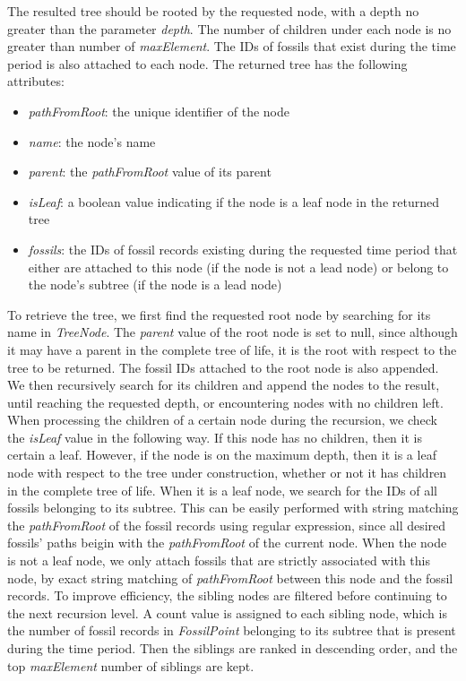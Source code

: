 \documentclass[11pt, a4paper,oneside,chapterprefix=false]{scrbook}
\begin{document}
The resulted tree should be rooted by the requested node, with a depth no greater than the parameter \emph{depth}. The number of children under each node is no greater than number of \emph{maxElement}. The IDs of fossils that exist during the time period is also attached to each node. The returned tree has the following attributes:  

\begin{itemize}
	\item \textit{pathFromRoot}: the unique identifier of the node
	\item \textit{name}: the node's name
	\item \textit{parent}: the \textit{pathFromRoot} value of its parent
	\item \textit{isLeaf}: a boolean value indicating if the node is a leaf node in the returned tree
	\item \textit{fossils}: the IDs of fossil records existing during the requested time period that either are attached to this node (if the node is not a lead node) or belong to the node's subtree (if the node is a lead node)
\end{itemize}

To retrieve the tree, we first find the requested root node by searching for its name in \emph{TreeNode}. The \emph{parent} value of the root node is set to null, since although it may have a parent in the complete tree of life, it is the root with respect to the tree to be returned. The fossil IDs attached to the root node is also appended. We then recursively search for its children and append the nodes to the result, until reaching the requested depth, or encountering nodes with no children left. When processing the children of a certain node during the recursion, we check the \emph{isLeaf} value in the following way. If this node has no children, then it is certain a leaf. However, if the node is on the maximum depth, then it is a leaf node with respect to the tree under construction, whether or not it has children in the complete tree of life. When it is a leaf node, we search for the IDs of all fossils belonging to its subtree. This can be easily performed with string matching the \emph{pathFromRoot} of the fossil records using regular expression, since all desired fossils' paths beigin with the \emph{pathFromRoot} of the current node. When the node is not a leaf node, we only attach fossils that are strictly associated with this node, by exact string matching of \emph{pathFromRoot} between this node and the fossil records. To improve efficiency, the sibling nodes are filtered before continuing to the next recursion level. A count value is assigned to each sibling node, which is the number of fossil records in \emph{FossilPoint} belonging to its subtree that is present during the time period. Then the siblings are ranked in descending order, and the top \emph{maxElement} number of siblings are kept. \\
\end{document}
